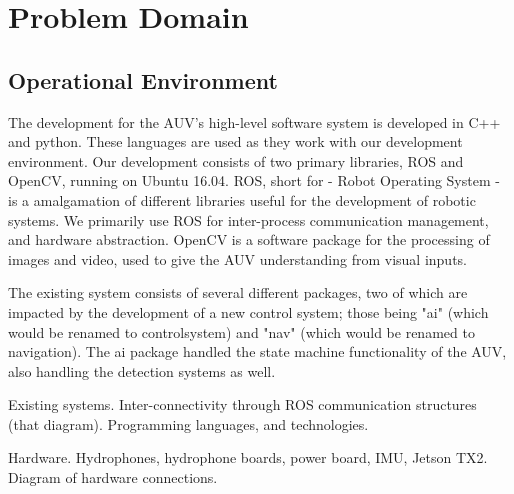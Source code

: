 
\chapter{Problem Domain} %

\label{Chapter2} %


\section{Operational Environment}

The development for the AUV's high-level software system is developed in C++ and python. These languages are used as they work with our development environment. Our development consists of two primary libraries, ROS and OpenCV, running on Ubuntu 16.04. ROS, short for - Robot Operating System - is a amalgamation of different libraries useful for the development of robotic systems. We primarily use ROS for inter-process communication management, and hardware abstraction. OpenCV is a software package for the processing of images and video, used to give the AUV understanding from visual inputs.

The existing system consists of several different packages, two of which are impacted by the development of a new control system; those being "ai" (which would be renamed to controlsystem) and "nav" (which would be renamed to navigation). The ai package handled the state machine functionality of the AUV, also handling the detection systems as well.

Existing systems.
Inter-connectivity through ROS communication structures (that diagram).
Programming languages, and technologies.

Hardware.
Hydrophones, hydrophone boards, power board, IMU, Jetson TX2.
Diagram of hardware connections.
